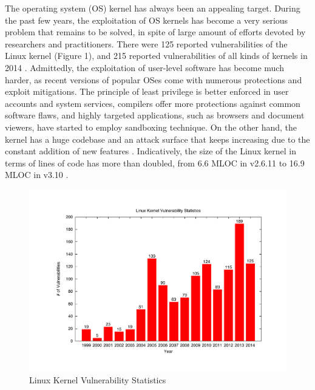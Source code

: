 \par
The operating system (OS) kernel has always been an appealing target.
During the past few years, the exploitation of OS kernels has become a very
serious problem that remains to be solved, in spite of large amount of
efforts devoted by researchers and practitioners. There were 125 reported
vulnerabilities of the Linux kernel \cite{CVE:14} (Figure 1), and 215
reported vulnerabilities of all kinds of kernels in 2014 \cite{NVD:14}.
Admittedly, the exploitation of user-level software has become much harder,
as recent versions of popular OSes come with numerous protections and
exploit mitigations. The principle of least privilege is better enforced in
user accounts and system services, compilers offer more protections against
common software flaws, and highly targeted applications, such as browsers
and document viewers, have started to employ sandboxing technique. On the
other hand, the kernel has a huge codebase and an attack surface that keeps
increasing due to the constant addition of new features \cite{Metrics:13}.
Indicatively, the size of the Linux kernel in terms of lines of code has
more than doubled, from 6.6 MLOC in v2.6.11 to 16.9 MLOC in v3.10
\cite{Linux:13}.


\begin{figure}[h]
\centering
\includegraphics[width=1.0\columnwidth]{diagram/linux_kernel_vul_total_stats.pdf}
\caption{Linux Kernel Vulnerability Statistics }
\label{fig:arch}
\end{figure}


